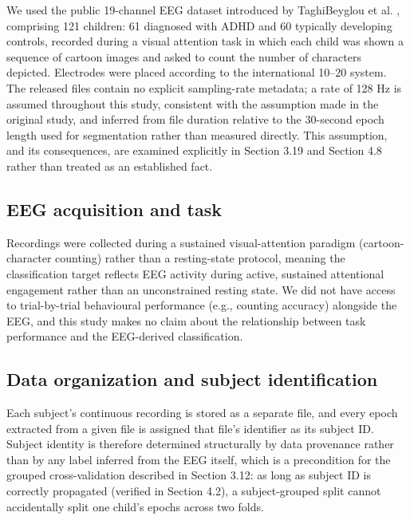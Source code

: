\documentclass[a4paper,fleqn]{cas-sc}
\begin{document}
We used the public 19-channel EEG dataset introduced by TaghiBeyglou et al. \cite{taghibeyglou2022detection}, comprising 121 children: 61 diagnosed with ADHD and 60 typically developing controls, recorded during a visual attention task in which each child was shown a sequence of cartoon images and asked to count the number of characters depicted. Electrodes were placed according to the international 10--20 system. The released files contain no explicit sampling-rate metadata; a rate of 128 Hz is assumed throughout this study, consistent with the assumption made in the original study, and inferred from file duration relative to the 30-second epoch length used for segmentation rather than measured directly. This assumption, and its consequences, are examined explicitly in Section 3.19 and Section 4.8 rather than treated as an established fact.



\subsection{EEG acquisition and task}

Recordings were collected during a sustained visual-attention paradigm (cartoon-character counting) rather than a resting-state protocol, meaning the classification target reflects EEG activity during active, sustained attentional engagement rather than an unconstrained resting state. We did not have access to trial-by-trial behavioural performance (e.g., counting accuracy) alongside the EEG, and this study makes no claim about the relationship between task performance and the EEG-derived classification.



\subsection{Data organization and subject identification}

Each subject's continuous recording is stored as a separate file, and every epoch extracted from a given file is assigned that file's identifier as its subject ID. Subject identity is therefore determined structurally by data provenance rather than by any label inferred from the EEG itself, which is a precondition for the grouped cross-validation described in Section 3.12: as long as subject ID is correctly propagated (verified in Section 4.2), a subject-grouped split cannot accidentally split one child's epochs across two folds.
\end{document}
